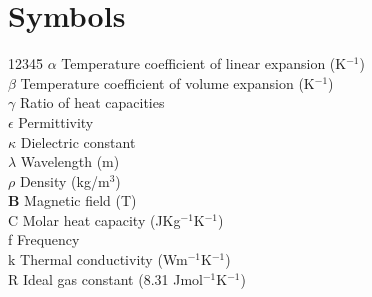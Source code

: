 \chapter*{Symbols}


\begin{tabbing}
12345\=\kill
$\alpha$ \> Temperature coefficient of linear expansion (K$^{-1}$)\\
$\beta$ \> Temperature coefficient of volume expansion (K$^{-1}$)\\
$\gamma $ \> Ratio of heat capacities \\
$\epsilon $ \> Permittivity\\
$\kappa$ \> Dielectric constant\\
$\lambda $ \> Wavelength (m)\\
$\rho $ \> Density (kg/m$^3$)\\
\textbf{B}   \>Magnetic field (T)\\
C \>Molar heat capacity (JKg$^{-1}$K$^{-1}$)\\
f \> Frequency\\
k \> Thermal conductivity (Wm$^{-1}$K$^{-1}$)\\
R  \> Ideal gas constant (8.31 Jmol$^{-1}$K$^{-1}$)\\

\end{tabbing}